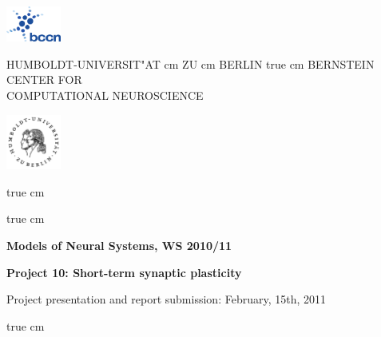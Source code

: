 \documentclass[12pt]{article}
\begin{document}
\parbox{2cm}{
\includegraphics[width=1.8cm]{../bccnlogo.pdf}
}
\parbox{11cm}{
\begin{center}
\large HUMBOLDT-UNIVERSIT"AT  cm ZU  cm BERLIN
 true cm
\mgross BERNSTEIN CENTER FOR\\ COMPUTATIONAL NEUROSCIENCE
\end{center}
}
\parbox{2cm}
{
\hfill
\includegraphics[width=1.8cm]{../hublogo.pdf}
}

 true cm



 true cm
\centerline{\bf Models of Neural Systems, WS 2010/11}
\centerline{\bf Project 10: Short-term synaptic plasticity} 
\centerline{Project presentation and report submission: February,
15th, 2011}

 true cm
\end{document}
